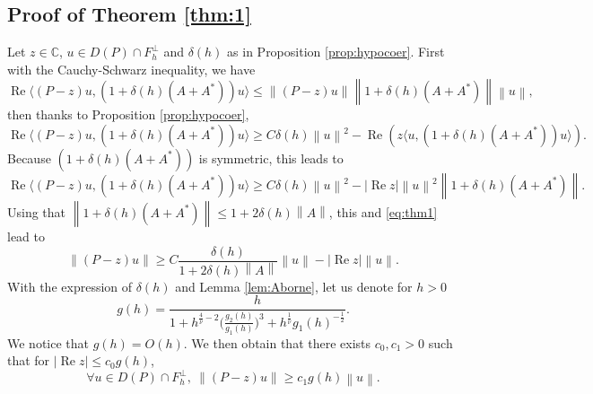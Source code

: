 \documentclass[12pt]{amsart}
\renewcommand{\Re}{\operatorname{Re}}
\newcommand{\C}{\mathbb C}
\def\<{\langle}
\def\>{\rangle}
\numberwithin{equation}{section}
\numberwithin{figure}{section}
\newcommand{\vvert}[1]{\left\lVert#1\right\rVert}
\begin{document}
\subsection{Proof of Theorem \ref{thm:1}}
Let $z\in\C$, $u\in D(P)\cap F_h^\bot$ and $\delta(h)$ as in Proposition \ref{prop:hypocoer}. First with the Cauchy-Schwarz inequality, we have
\begin{equation}\label{eq:thm1}
\Re\< (P-z)u, (1+\delta(h)(A+A^*))u \> \leq \vvert{(P-z)u}\vvert{1+\delta(h)(A+A^*)}\vvert{u},
\end{equation}
then thanks to %
Proposition \ref{prop:hypocoer}, 
\begin{equation*}
\Re\< (P-z)u, (1+\delta(h)(A+A^*))u \> \geq C\delta(h)\vvert{u}^2-\Re(z\< u,(1+\delta(h)(A+A^*))u\>).
\end{equation*}
Because %
$(1+\delta(h)(A+A^*))$ is symmetric, this leads %
to
\begin{equation*}
\Re\< (P-z)u, (1+\delta(h)(A+A^*))u \> \geq C\delta(h)\vvert{u}^2-|\Re z|\vvert{u}^2\vvert{1+\delta(h)(A+A^*)}.
\end{equation*}
Using %
that $\vvert{1+\delta(h)(A+A^*)} \leq 1 + 2\delta(h)\vvert{A}$, %
this and \eqref{eq:thm1} lead to
\begin{equation*}
\vvert{(P-z)u} \geq C\frac{\delta(h)}{1 + 2\delta(h)\vvert{A}}\vvert{u} - |\Re z|\vvert{u}.
\end{equation*}
With the expression of $\delta(h)$ and Lemma \ref{lem:Aborne}, let us denote for $h>0$
\begin{equation}\label{eq:g}
g(h) = \frac{h}{1 + h^{\frac{4}{\overline\nu}-2}\Big(\frac{g_2(h)}{g_1(h)}\Big)^{3} + h^{\frac1{\overline\nu}}g_1(h)^{-\frac12}}.
\end{equation}
We notice that $g(h) = O(h)$. We then obtain that there exists $c_0,c_1>0$ such that for $|\Re z| \leq c_0g(h)$,\begin{equation}\label{eq:hypoPi}
\forall u\in D(P)\cap F_h^\bot,\ \vvert{(P-z)u} \geq c_1g(h)\vvert{u}.
\end{equation}
\end{document}
